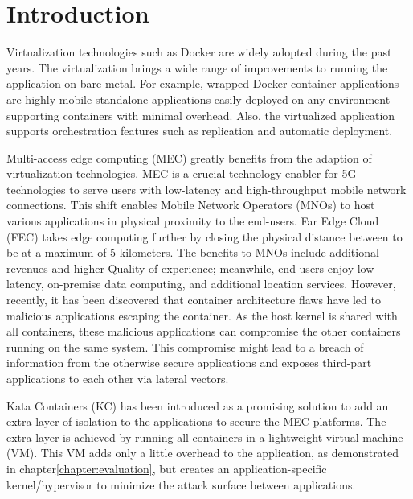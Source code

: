 \chapter{Introduction}
\label{chapter:intro}



Virtualization technologies such as Docker are widely adopted during the past years. The virtualization brings a wide range of improvements to running the application on bare metal. For example, wrapped Docker container applications are highly mobile standalone applications easily deployed on any environment supporting containers with minimal overhead. Also, the virtualized application supports orchestration features such as replication and automatic deployment.

Multi-access edge computing (MEC) greatly benefits from the adaption of virtualization technologies. MEC is a crucial technology enabler for 5G technologies to serve users with low-latency and high-throughput mobile network connections. This shift enables Mobile Network Operators (MNOs) to host various applications in physical proximity to the end-users. Far Edge Cloud (FEC) takes edge computing further by closing the physical distance between to be at a maximum of 5 kilometers. The benefits to MNOs include additional revenues and higher Quality-of-experience; meanwhile, end-users enjoy low-latency, on-premise data computing, and additional location services. However, recently, it has been discovered that container architecture flaws have led to malicious applications escaping the container. As the host kernel is shared with all containers, these malicious applications can compromise the other containers running on the same system. This compromise might lead to a breach of information from the otherwise secure applications and exposes third-part applications to each other via lateral vectors.

Kata Containers (KC) \cite{KataContainers} has been introduced as a promising solution to add an extra layer of isolation to the applications to secure the MEC platforms. The extra layer is achieved by running all containers in a lightweight virtual machine (VM). This VM adds only a little overhead to the application, as demonstrated in chapter\ref{chapter:evaluation}, but creates an application-specific kernel/hypervisor to minimize the attack surface between applications.

